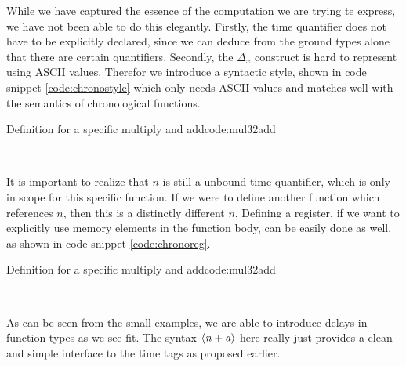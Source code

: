 While we have captured the essence of the computation we are trying te express, we have not been able to do this elegantly.
Firstly, the time quantifier does not have to be explicitly declared, since we can deduce from the ground types alone that there are certain quantifiers.
Secondly, the \ensuremath{\Delta_x} construct is hard to represent using ASCII values.
Therefor we introduce a syntactic style, shown in code snippet \ref{code:chronostyle} which only needs ASCII values and matches well with the semantics of chronological functions.
\begin{texexptitled}{Definition for a specific multiply and add}{code:mul32add}
\begin{hscode}\SaveRestoreHook
{}%
%
\>[B]{}\mathbin{::}\langle{}\rangle\to {}\langle{}\mathbin{+}\rangle\to {}\langle{}\mathbin{+}\rangle{}\<[E]%
\\
\>[B]{}\;\;\mathrel{=}\mathbin{+}\<[E]%
\ColumnHook
\end{hscode}\resethooks
\end{texexptitled}
It is important to realize that $n$ is still a unbound time quantifier, which is only in scope for this specific function.
If we were to define another function which references $n$, then this is a distinctly different $n$.
Defining a register, if we want to explicitly use memory elements in the function body, can be easily done as well, as shown in code snippet \ref{code:chronoreg}.
\begin{texexptitled}{Definition for a specific multiply and add}{code:mul32add}
\begin{hscode}\SaveRestoreHook
{}%
%
\>[B]{}\mathbin{::}\langle{}\rangle\to {}\langle{}\mathbin{+}\rangle{}\<[E]%
\\
\>[B]{}\;\mathrel{=}\<[E]%
\ColumnHook
\end{hscode}\resethooks
\end{texexptitled}
As can be seen from the small examples, we are able to introduce delays in function types as we see fit.
The syntax \ensuremath{\langle\Varid{n}\mathbin{+}\Varid{a}\rangle} here really just provides a clean and simple interface to the time tags as proposed earlier.

